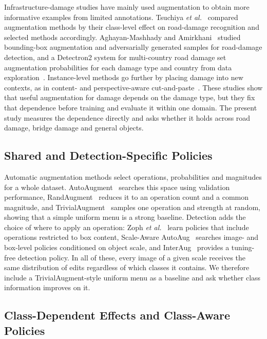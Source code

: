 \documentclass[conference]{IEEEtran}
\begin{document}
Infrastructure-damage studies have mainly used augmentation to obtain more informative examples from limited annotations. Tsuchiya \emph{et al.}~\cite{tsuchiya2019} compared augmentation methods by their class-level effect on road-damage recognition and selected methods accordingly. Aghayan-Mashhady and Amirkhani~\cite{aghayan2024} studied bounding-box augmentation and adversarially generated samples for road-damage detection, and a Detectron2 system for multi-country road damage set augmentation probabilities for each damage type and country from data exploration~\cite{rdd_detectron2}. Instance-level methods go further by placing damage into new contexts, as in content- and perspective-aware cut-and-paste~\cite{rdd_cutpaste}. These studies show that useful augmentation for damage depends on the damage type, but they fix that dependence before training and evaluate it within one domain. The present study measures the dependence directly and asks whether it holds across road damage, bridge damage and general objects.

\subsection{Shared and Detection-Specific Policies}

Automatic augmentation methods select operations, probabilities and magnitudes for a whole dataset. AutoAugment~\cite{cubuk2019auto} searches this space using validation performance, RandAugment~\cite{cubuk2020rand} reduces it to an operation count and a common magnitude, and TrivialAugment~\cite{muller2021trivial} samples one operation and strength at random, showing that a simple uniform menu is a strong baseline. Detection adds the choice of where to apply an operation: Zoph \emph{et al.}~\cite{zoph2020det} learn policies that include operations restricted to box content, Scale-Aware AutoAug~\cite{chen2021scale} searches image- and box-level policies conditioned on object scale, and InterAug~\cite{thopalli2023interaug} provides a tuning-free detection policy. In all of these, every image of a given scale receives the same distribution of edits regardless of which classes it contains. We therefore include a TrivialAugment-style uniform menu as a baseline and ask whether class information improves on it.

\subsection{Class-Dependent Effects and Class-Aware Policies}
\end{document}
